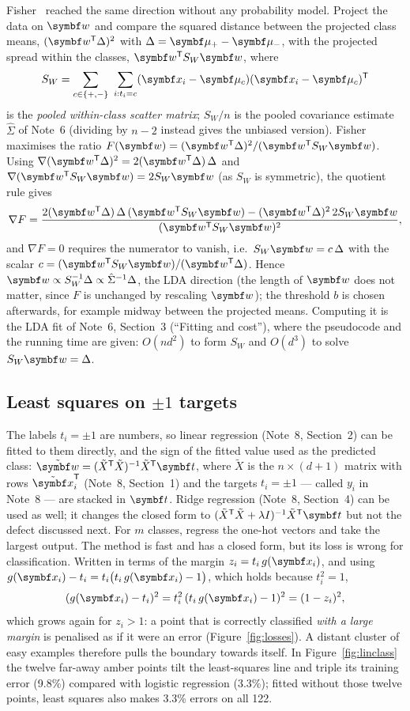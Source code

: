 \documentclass[11pt]{article}
\newcommand{\w}{\vect{w}}
\newcommand{\xt}{\tilde{\x}}
\newcommand{\wt}{\tilde{\w}}
\newcommand{\Xt}{\tilde X}
\begin{document}
Fisher~\cite{fisher1936} reached the same direction without any probability model. Project the data on $\w$ and compare
the squared distance between the projected class means, $(\w\T\Delta)^2$ with $\Delta = \vmu_+ - \vmu_-$, with the
projected spread within the classes, $\w\T S_W\w$, where
\[
  S_W = \sum_{c \in \{+, -\}}\ \sum_{i : t_i = c} (\x_i - \vmu_c)(\x_i - \vmu_c)\T
\]
is the \emph{pooled within-class scatter matrix}; $S_W/n$ is the pooled covariance estimate $\hat\Sigma$ of
Note~6 (dividing by $n - 2$ instead gives the unbiased version). Fisher maximises the ratio $F(\w) = (\w\T\Delta)^2/(\w\T S_W\w)$. Using $\nabla(\w\T\Delta)^2 =
2(\w\T\Delta)\,\Delta$ and $\nabla(\w\T S_W\w) = 2S_W\w$ (as $S_W$ is symmetric), the quotient rule gives
\[
  \nabla F = \frac{2(\w\T\Delta)\,\Delta\,(\w\T S_W\w) - (\w\T\Delta)^2\, 2S_W\w}{(\w\T S_W\w)^2} ,
\]
and $\nabla F = 0$ requires the numerator to vanish, i.e.\ $S_W\w = c\,\Delta$ with the scalar $c = (\w\T S_W\w)/(\w\T\Delta)$.
Hence $\w \propto S_W^{-1}\Delta \propto \hat\Sigma^{-1}\Delta$, the LDA direction (the length of $\w$ does not matter,
since $F$ is unchanged by rescaling $\w$); the threshold $b$ is chosen afterwards, for example midway between the projected
means. Computing it is the LDA fit of Note~6, Section~3 (``Fitting and cost''), where the pseudocode and the running time are given:
$O(nd^2)$ to form $S_W$ and $O(d^3)$ to solve $S_W\w = \Delta$.

\subsection{Least squares on \texorpdfstring{$\pm 1$}{plus-minus one} targets}

The labels $t_i = \pm1$ are numbers, so linear regression (Note~8, Section~2) can be fitted to them directly, and the
sign of the fitted value used as the predicted class: $\wt = (\Xt\T\Xt)^{-1}\Xt\T\vect{t}$, where $\Xt$ is the $n \times (d +
1)$ matrix with rows $\xt_i\T$ (Note~8, Section~1) and the targets $t_i = \pm1$ --- called $y_i$ in Note~8 --- are stacked in
$\vect{t}$. Ridge regression (Note~8, Section~4) can be used as well; it changes the closed form to $(\Xt\T\Xt +
\lambda I)^{-1}\Xt\T\vect{t}$ but not the defect discussed next. For $m$ classes, regress the one-hot vectors and take
the largest output. The method is fast and has a closed form, but its loss is wrong for classification. Written in terms
of the margin $z_i = t_i\,g(\x_i)$, and using $g(\x_i) - t_i = t_i\big(t_i\,g(\x_i) - 1\big)$, which holds because $t_i^2 = 1$,
\[
  (g(\x_i) - t_i)^2 = t_i^2\,(t_i\,g(\x_i) - 1)^2 = (1 - z_i)^2 ,
\]
which grows again for $z_i > 1$: a point that is correctly classified \emph{with a large margin} is penalised as if it
were an error (Figure~\ref{fig:losses}). A distant cluster of easy examples therefore pulls the boundary towards
itself. In Figure~\ref{fig:linclass} the twelve far-away amber points tilt the least-squares line and triple its training
error (9.8\%) compared with logistic regression (3.3\%); fitted without those twelve points, least squares also makes
3.3\% errors on all 122.
\end{document}

